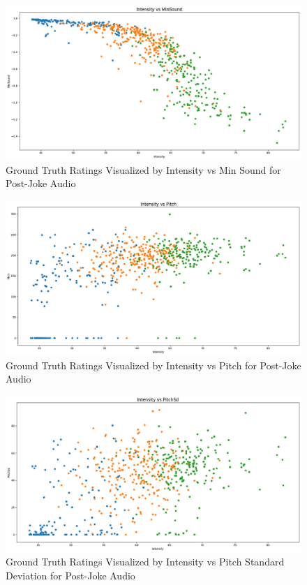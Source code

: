\documentclass[onecolumn, draftclsnofoot,10pt, compsoc]{IEEEtran}
\begin{document}
\begin{figure}[!h]
\includegraphics[width=\linewidth]{assets/fig9.eps}
\caption{Ground Truth Ratings Visualized by Intensity vs Min Sound for Post-Joke Audio}
\end{figure}

\begin{figure}[!h]
\includegraphics[width=\linewidth]{assets/fig10.eps}
\caption{Ground Truth Ratings Visualized by Intensity vs Pitch for Post-Joke Audio}
\end{figure}

\begin{figure}[!h]
\includegraphics[width=\linewidth]{assets/fig11.eps}
\caption{Ground Truth Ratings Visualized by Intensity vs Pitch Standard Deviation for Post-Joke Audio}
\end{figure}
\end{document}
